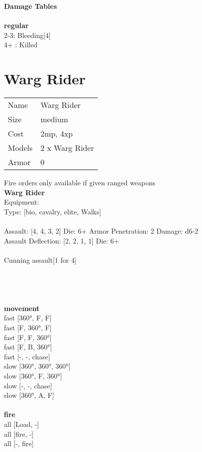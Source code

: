 {\bf Damage Tables} \\
\ \\ {\bf regular } \\
2-3: Bleeding[4] \\
4+ : Killed \\










\pagebreak\pagebreak

\section{ Warg Rider }

\begin{tabular}{ll}
  Name & Warg Rider \\
  Size & medium\\
  Cost & 2mp, 4xp\\
  Models & 2 x Warg Rider\\
  Armor & 0\\
\end{tabular}

\noindent Fire orders only available if given ranged weapons\\ 


{\bf Warg Rider } \\
Equipment:  \\
Type: [bio, cavalry, elite, Walks] \\
\ \\
Assault: [4, 4, 3, 2] Die: 6+ Armor Penetration: 2 Damage: d6-2 \\
Assault Deflection: [2, 2, 1, 1] Die: 6+\\
\\ 
Cunning assault[1 for 4]\\ 
 
\ \\

\ \\
 
\ \\




\ \\ {\bf movement } \\
fast [360°, F, F] \\
fast [F, 360°, F] \\
fast [F, F, 360°] \\
fast [F, B, 360°] \\
fast [-, -, chase] \\
slow [360°, 360°, 360°] \\
slow [360°, F, 360°] \\
slow [-, -, chase] \\
slow [360°, A, F] \\
\ \\ {\bf fire } \\
all [Load, -] \\
all [fire, -] \\
all [-, fire] \\


